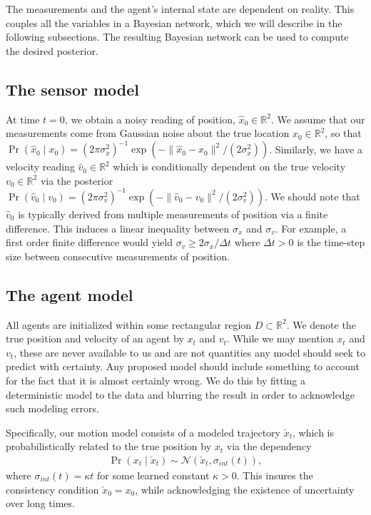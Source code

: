 \documentclass[conference]{IEEEtran}
\begin{document}
The measurements and the agent's internal state are dependent on reality.  This couples all the variables in a Bayesian network, which we will describe in the following subsections.
The resulting Bayesian network can be used to compute the desired posterior.

\subsection{The sensor model}
At time $t=0$, we obtain a noisy reading of position, $\hat{x}_0 \in \mathbb{R}^2$.
We assume that our measurements come from Gaussian noise about the true location $x_0 \in \mathbb{R}^2$,
so that $\Pr(\hat{x}_0 \mid x_0 ) = (2\pi \sigma_x^2)^{-1} \exp( - \| \hat{x}_0 - x_0 \|^2 / (2 \sigma_x^2) )$.
Similarly, we have a velocity reading $\hat{v}_0 \in \mathbb{R}^2$ which is conditionally dependent on the true velocity $v_0 \in \mathbb{R}^2$
via the posterior $\Pr( \hat{v}_0 \mid v_0 ) = (2\pi \sigma_v^2)^{-1} \exp( - \| \hat{v}_0 - v_0 \|^2 / (2 \sigma_v^2) )$.
We should note that $\hat{v}_0$ is typically derived from multiple measurements of position via a finite difference.
This induces a linear inequality between $\sigma_x$ and $\sigma_v$.
For example, a first order finite difference would yield $\sigma_v \geq 2 \sigma_x / \Delta t$ where $\Delta t > 0$ is the time-step size between consecutive measurements of position.

\subsection{The agent model}
All agents are initialized within some rectangular region $D \subset \mathbb{R}^2$.
We denote the true position and velocity of an agent by $x_t$ and $v_t$.
While we may mention $x_t$ and $v_t$, these are never available to us and are not quantities any model should seek to predict with certainty.
Any proposed model should include something to account for the fact that it is almost certainly wrong.
We do this by fitting a deterministic model to the data and blurring the result in order to acknowledge such modeling errors.

Specifically, our motion model consists of a modeled trajectory $\check{x}_t$, which is probabilistically related to the true position by $x_t$ via the dependency
\begin{align*}
	\Pr( x_t \mid \check{x}_t ) \sim \mathcal{N}( \check{x}_t, \sigma_{int}(t)),
\end{align*}
where $\sigma_{int}(t) = \kappa t$ for some learned constant $\kappa > 0$.
This insures the consistency condition $\check{x}_0 = x_0$, while acknowledging the existence of uncertainty over long times.
\end{document}
